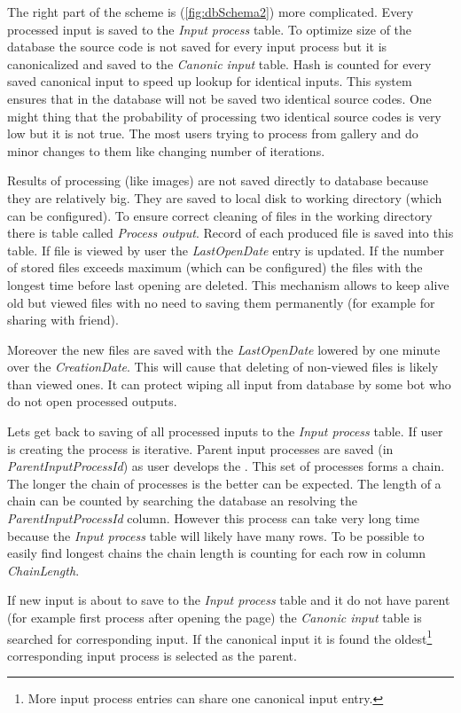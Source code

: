The right part of the scheme is (\autoref{fig:dbSchema2}) more complicated.
Every processed input is saved to the \emph{Input process} table.
To optimize size of the database the source code is not saved for every input process but it is canonicalized and saved to the \emph{Canonic input} table.
Hash is counted for every saved canonical input to speed up lookup for identical inputs.
This system ensures that in the database will not be saved two identical source codes.
One might thing that the probability of processing two identical source codes is very low but it is not true.
The most users trying to process \lsystems from gallery and do minor changes to them like changing number of iterations.

Results of processing (like images) are not saved directly to database because they are relatively big.
They are saved to local disk to working directory (which can be configured).
To ensure correct cleaning of files in the working directory there is table called \emph{Process output}.
Record of each produced file is saved into this table.
If file is viewed by user the \emph{LastOpenDate} entry is updated.
If the number of stored files exceeds maximum (which can be configured) the files with the longest time before last opening are deleted.
This mechanism allows to keep alive old but viewed files with no need to saving them permanently (for example for sharing with friend).

Moreover the new files are saved with the \emph{LastOpenDate} lowered by one minute over the \emph{CreationDate}.
This will cause that deleting of non-viewed files is likely than viewed ones.
It can protect wiping all input from database by some bot who do not open processed outputs.

Lets get back to saving of all processed inputs to the \emph{Input process} table.
If user is creating \lsystem the process is iterative.
Parent input processes are saved (in \emph{ParentInputProcessId}) as user develops the \lsystem.
This set of processes forms a chain.
The longer the chain of processes is the better can be expected.
The length of a chain can be counted by searching the database an resolving the \emph{ParentInputProcessId} column.
However this process can take very long time because the \emph{Input process} table will likely have many rows.
To be possible to easily find longest chains the chain length is counting for each row in column \emph{ChainLength}.

If new input is about to save to the \emph{Input process} table and it do not have parent (for example first process after opening the page) the \emph{Canonic input} table is searched for corresponding input.
If the canonical input it is found the oldest\footnote{More input process entries can share one canonical input entry.} corresponding input process is selected as the parent.


